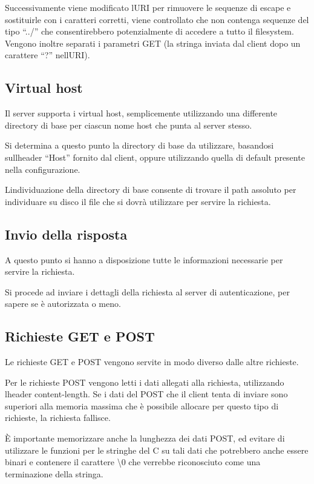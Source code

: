 \documentclass[a4paper,11pt]{article}
\begin{document}
{\sffamily
Successivamente viene modificato l{\textquotesingle}URI per rimuovere le
sequenze di escape e sostituirle con i caratteri corretti, viene
controllato che non contenga sequenze del tipo
{\textquotedblleft}../{\textquotedblright} che consentirebbero
potenzialmente di accedere a tutto il filesystem. Vengono inoltre
separati i parametri GET (la stringa inviata dal client dopo un
carattere {\textquotedblleft}?{\textquotedblright}
nell{\textquotesingle}URI).}

\subsection{Virtual host}
{\sffamily
Il server supporta i virtual host, semplicemente utilizzando una
differente directory di base per ciascun nome host che punta al server
stesso.}

{\sffamily
Si determina a questo punto la directory di base da utilizzare,
basandosi sull{\textquotesingle}header
{\textquotedblleft}Host{\textquotedblright} fornito dal client, oppure
utilizzando quella di default presente nella configurazione.}

{\sffamily
L{\textquotesingle}individuazione della directory di base consente di
trovare il path assoluto per individuare su disco il file che si
dovr\`a utilizzare per servire la richiesta.}

\subsection{Invio della risposta}
{\sffamily
A questo punto si hanno a disposizione tutte le informazioni necessarie
per servire la richiesta.}

{\sffamily
Si procede ad inviare i dettagli della richiesta al server di
autenticazione, per sapere se \`e autorizzata o meno.}

\subsection{Richieste GET e POST}
{\sffamily
Le richieste GET e POST vengono servite in modo diverso dalle altre
richieste.}

{\sffamily
Per le richieste POST vengono letti i dati allegati alla richiesta,
utilizzando l{\textquotesingle}header content-length. Se i dati del
POST che il client tenta di inviare sono superiori alla memoria massima
che \`e possibile allocare per questo tipo di richieste, la richiesta
fallisce.}

{\sffamily
\`E importante memorizzare anche la lunghezza dei dati POST, ed evitare
di utilizzare le funzioni per le stringhe del C su tali dati che
potrebbero anche essere binari e contenere il carattere
{\textbackslash}0 che verrebbe riconosciuto come una terminazione della
stringa.}
\end{document}
